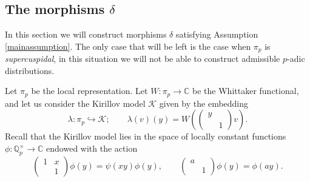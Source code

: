 \documentclass{amsart}
\newcommand{\Q}{{\mathbb Q}}
\newcommand{\C}{{\mathbb C}}
\begin{document}
\subsection{The morphisms $\delta$}

In this section we will construct morphisms $\delta$ satisfying Assumption \ref{mainassumption}. The only case that will be left is the case when $\pi_p$ is \emph{supercuspidal}, in this situation we will not be able to construct admissible $p$-adic distributions.

Let $\pi_p$ be the local representation. Let $W:\pi_p\rightarrow\C$ be the Whittaker functional, and let us consider the Kirillov model $\mathcal{K}$ given by the embedding
\[
\lambda:\pi_p\hookrightarrow \mathcal{K};\qquad \lambda(v)(y)=W\left(\left(\begin{array}{cc}y&\\&1\end{array}\right)v\right).
\]
Recall that the Kirillov model lies in the space of locally constant functions $\phi:\Q_p^\times\rightarrow\C$ endowed with the action
\begin{equation}\label{eqKir}
\left(\begin{array}{cc}1&x\\&1\end{array}\right)\phi(y)=\psi(xy)\phi(y),\qquad \left(\begin{array}{cc}a&\\&1\end{array}\right)\phi(y)=\phi(ay).
\end{equation}
\end{document}

